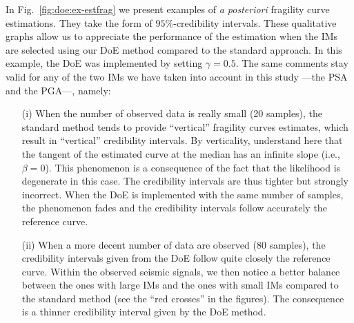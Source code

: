     In Fig.~\ref{fig:doe:ex-estfrag} we present examples of \emph{a posteriori} fragility curve estimations. They take the form of {$95\%$-credibility intervals. These qualitative graphs allow us to appreciate the performance of the estimation when the IMs are selected using our DoE method compared to the standard approach. In this example, the DoE was implemented by setting $\gamma=0.5$.} The same comments stay valid for any of the two IMs we have taken into account in this study ---the PSA and the PGA---, namely: 
    \begin{enumerate}
        \item[(i)] When the number of observed data is really small (20 samples), the standard method tends to provide ``vertical'' fragility curves estimates, which result in ``vertical'' credibility intervals. By verticality, understand here that the tangent of the estimated curve at the median has an infinite slope (i.e., $\beta=0$). This phenomenon is a consequence of the fact that the likelihood is degenerate in this case.
        The credibility intervals are thus tighter but strongly incorrect.
        When the DoE is implemented with the same number of samples, the phenomenon fades and the credibility intervals follow accurately the reference curve.
        \item[(ii)] When a more decent number of data are observed (80 samples), the credibility intervals given from the DoE follow quite closely the reference curve. Within the observed seismic signals, we then notice a better balance between the ones with large IMs and the ones with small IMs compared to the standard method {(see the ``red crosses'' in the figures).} The consequence is a thinner credibility interval given by the DoE method.
    \end{enumerate}
    
